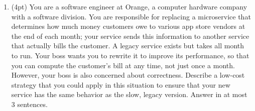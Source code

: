 \documentclass{report}
\newif\ifkey
\newcommand{\answervvshort}[1]{\ifkey\color{red}\underline{\textbf{#1}}\color{black}\else\underline{\hspace{0.5in}}\fi\xspace}
\newcommand{\answerlong}[1]{\ifkey\color{red}\textbf{#1}\color{black}\else\vspace{0.5in}\fi\xspace}
\newcommand*{\pts}[1]{\addtocounter{points}{#1}(#1pt)}
\begin{document}
\begin{spacing}{1.4}
\begin{enumerate}[leftmargin=*]
  \begin{lstlisting}[escapechar=\%]
def f(a, b, c) {
                   [ a -> %\answervvshort{T}%, b -> %\answervvshort{T}%, c -> %\answervvshort{T}%, d -> %\answervvshort{T}% ]
  if (*) {
                   [ a -> %\answervvshort{T}%, b -> %\answervvshort{T}%, c -> %\answervvshort{T}%, d -> %\answervvshort{T}% ]
    d = a + b;
                   [ a -> %\answervvshort{U}%, b -> %\answervvshort{U}%, c -> %\answervvshort{T}%, d -> %\answervvshort{T}% ]
  } else {
                   [ a -> %\answervvshort{T}%, b -> %\answervvshort{T}%, c -> %\answervvshort{T}%, d -> %\answervvshort{T}% ]
    d = a + c;
                   [ a -> %\answervvshort{U}%, b -> %\answervvshort{T}%, c -> %\answervvshort{U}%, d -> %\answervvshort{T}% ]
  }
                   [ a -> %\answervvshort{U}%, b -> %\answervvshort{T}%, c -> %\answervvshort{T}%, d -> %\answervvshort{T}% ]
  return d;
                   [ a -> %\answervvshort{U}%, b -> %\answervvshort{T}%, c -> %\answervvshort{T}%, d -> %\answervvshort{U}% ]
}
  \end{lstlisting}

\item \pts{4} You are a software engineer at Orange, a computer hardware company with a software division.
  You are responsible for replacing a microservice that
  determines how much money customers owe to various app store vendors at the end of each month; your service sends this information
  to another service that actually bills the customer. A legacy service exists but takes all month to run. Your boss wants you to rewrite
  it to improve its performance, so that you can compute the customer's bill at any time, not just once a month.
  However, your boss is also concerned about correctness. Describe a low-cost strategy that you
  could apply in this situation to ensure that your new service has the same behavior as the slow, legacy version. Answer in at most 3 sentences.
  \\\answerlong{The correct thing to do here is to apply differential testing (aka ``tests for free''): log all traffic to the old service,
    and check that the new service produces the same answers as the old one for each input for some period of time (until your boss is
    satisfied, probably).}

  

\end{enumerate}
\end{spacing}
\end{document}

